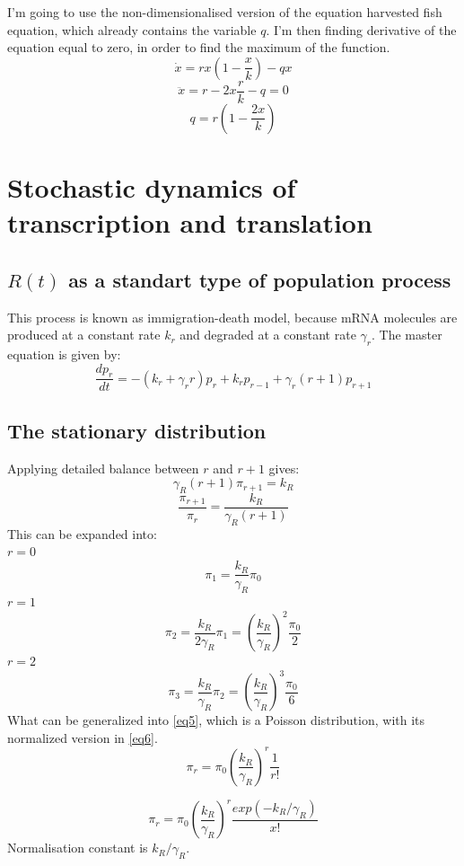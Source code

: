 \documentclass[a4paper]{article}
\begin{document}
I'm going to use the non-dimensionalised version of the equation harvested fish equation, which already contains the variable $q$. I'm then finding derivative of the equation equal to zero, in order to find the maximum of the function. 
\[\dot{x} = rx(1 - \frac{x}{k}) - qx\]
\[\ddot{x} = r - 2x\frac{r}{k} - q = 0\]
\[q = r(1- \frac{2x}{k})\]

\pagebreak

\section{Stochastic dynamics of transcription and translation}
\subsection{$R(t)$ as a standart type of population process}
This process is known as immigration-death model, because mRNA molecules are produced at a constant rate $k_r$ and degraded at a constant rate $\gamma_r$. The master equation is given by:
\begin{equation}
\frac{dp_r}{dt} = -(k_r + \gamma_r r)p_r + k_rp_{r-1} + \gamma_r(r+1)p_{r+1}
\end{equation}

\subsection{The stationary distribution}
Applying detailed balance between $r$ and \(r+1\) gives:
\[\gamma_R(r+1)\pi_{r+1} = k_R\]
\[\frac{\pi_{r+1}}{\pi_r} = \frac{k_R}{\gamma_R (r+1)}\]
This can be expanded into:\\
\(r = 0\)
\[\pi_1 = \frac{k_R}{\gamma_R}\pi_0\]
\(r = 1\)
\[\pi_2 = \frac{k_R}{2\gamma_R}\pi_1 = {(\frac{k_R}{\gamma_R})}^2\frac{\pi_0}{2}\]
\(r = 2\)
\[\pi_3 = \frac{k_R}{\gamma_R}\pi_2 = {(\frac{k_R}{\gamma_R})}^3\frac{\pi_0}{6}\]
What can be generalized into \ref{eq5}, which is a Poisson distribution, with its normalized version in \ref{eq6}. 
\begin{equation}
\label{eq5}
\pi_r = \pi_0 {(\frac{k_R}{\gamma_R})}^r \frac{1}{r!}
\end{equation}

\begin{equation}
\label{eq6}
\pi_r = \pi_0{(\frac{k_R}{\gamma_R})}^r \frac{exp(-k_R/\gamma_R)}{x!}
\end{equation}
Normalisation constant is \(k_R/\gamma_R\). 
\end{document}
